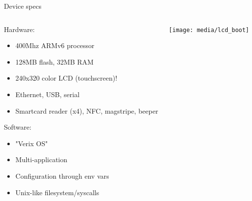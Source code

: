 \documentclass[12pt,aspectratio=169]{beamer}
\begin{document}





\begin{frame}{Device specs}
\begin{columns}
	\begin{column}{0.5\textwidth}
		Hardware:
		\begin{itemize}
			\item 400Mhz ARMv6 processor
			\item 128MB flash, 32MB RAM
			\item 240x320 color LCD (touchscreen)!
			\item Ethernet, USB, serial
			\item Smartcard reader (x4), NFC, magstripe, beeper
		\end{itemize}
		Software:
		\begin{itemize}
			\item "Verix OS"
			\item Multi-application
			\item Configuration through env vars
			\item Unix-like filesystem/syscalls
		\end{itemize}
	\end{column}
	\begin{column}{0.5\textwidth}
		\centering
		\texttt{[image: media/lcd\_boot]}
	\end{column}
\end{columns}
\end{frame}
\end{document}
